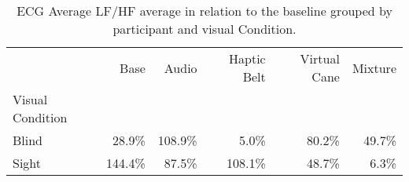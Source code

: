 
\begin{table}[!htb]
\centering
\caption{ECG Average LF/HF average in relation to the baseline grouped by participant and visual Condition.}
\label{tab:ecg_lfhf_average_group}
\begin{tabular}{lrrrrr}
\toprule
{} &     Base &    Audio & Haptic Belt & Virtual Cane & Mixture \\
Visual Condition &          &          &             &              &         \\
\midrule
Blind            &   28.9\% &  108.9\% &       5.0\% &       80.2\% &  49.7\% \\
Sight            &  144.4\% &   87.5\% &     108.1\% &       48.7\% &   6.3\% \\
\bottomrule
\end{tabular}
\end{table}

